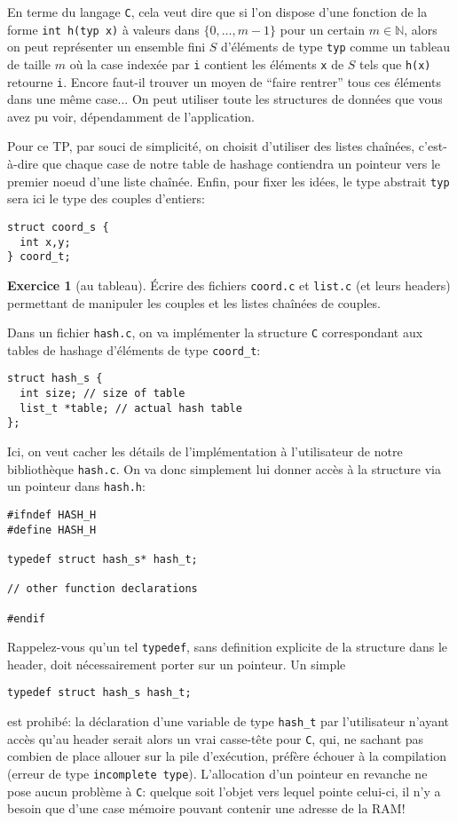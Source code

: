 \documentclass[french,a4paper]{article}
\theoremstyle{definition}
\newtheorem{exercise}{Exercice}
\theoremstyle{remark}
\newcommand{\shell}[1]{\lstinline[style={},style=sh]|#1|}
\newcommand{\inlinec}[1]{\lstinline[style=C]°#1°}
\begin{document}
En terme du langage {\tt C}, cela veut dire que si l'on dispose d'une
fonction de la forme \inlinec{int h(typ x)} à valeurs dans
$\{0,\dots,m-1\}$ pour un certain $m \in \mathbb N$, alors on peut
représenter un ensemble fini $S$ d'éléments de type \inlinec{typ}
comme un tableau de taille $m$ où la case indexée par \inlinec{i}
contient les éléments \inlinec{x} de $S$ tels que \inlinec{h(x)}
retourne \inlinec{i}. Encore faut-il trouver un moyen de ``faire
rentrer'' tous ces éléments dans une même case... On peut utiliser
toute les structures de données que vous avez pu voir, dépendamment de
l'application.

Pour ce TP, par souci de simplicité, on choisit d'utiliser des listes
chaînées, c'est-à-dire que chaque case de notre table de hashage
contiendra un pointeur vers le premier noeud d'une liste
chaînée. Enfin, pour fixer les idées, le type abstrait \inlinec{typ}
sera ici le type des couples d'entiers:
\begin{lstlisting}
struct coord_s {
  int x,y;
} coord_t;
\end{lstlisting}

\begin{exercise}[au tableau]
  \'Ecrire des fichiers \shell{coord.c} et \shell{list.c} (et leurs
  headers) permettant de manipuler les couples et les listes chaînées
  de couples.
\end{exercise}

Dans un fichier \shell{hash.c}, on va implémenter la
structure {\tt C} correspondant aux tables de hashage d'éléments de
type \inlinec{coord_t}:
\begin{lstlisting}
struct hash_s {
  int size; // size of table
  list_t *table; // actual hash table
};
\end{lstlisting}
Ici, on veut cacher les détails de l'implémentation à l'utilisateur de
notre bibliothèque \shell{hash.c}. On va donc simplement
lui donner accès à la structure via un pointeur dans \shell{hash.h}:
\begin{lstlisting}
#ifndef HASH_H
#define HASH_H

typedef struct hash_s* hash_t;

// other function declarations

#endif
\end{lstlisting}
Rappelez-vous qu'un tel \inlinec{typedef}, sans definition explicite
de la structure dans le header, doit nécessairement porter sur un
pointeur. Un simple
\begin{lstlisting}
typedef struct hash_s hash_t;

\end{lstlisting}
est prohibé: la déclaration d'une variable de type \inlinec{hash_t}
par l'utilisateur n'ayant accès qu'au header serait alors un vrai
casse-tête pour {\tt C}, qui, ne sachant pas combien de place allouer
sur la pile d'exécution, préfère échouer à la compilation (erreur de
type \shell{incomplete type}). L'allocation d'un pointeur en revanche
ne pose aucun problème à {\tt C}: quelque soit l'objet vers lequel
pointe celui-ci, il n'y a besoin que d'une case mémoire pouvant
contenir une adresse de la RAM!
\end{document}
